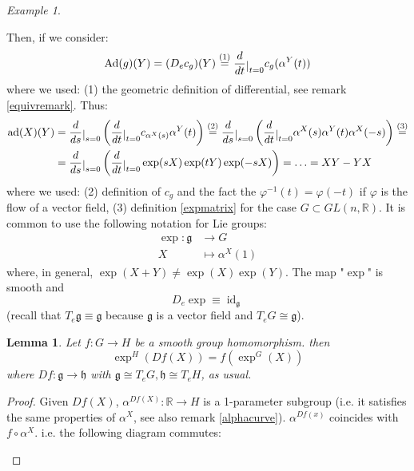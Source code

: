 \documentclass[a4paper,11pt,titlepage, article, oneside]{memoir}
\numberwithin{equation}{section}
\newtheorem{lemma}[theorem]{Lemma}
\theoremstyle{definition}
\theoremstyle{remark}
\newtheorem{example}[theorem]{Example}
\DeclareMathOperator{\id}{id}
\newcommand{\rfield}{\mathbb{R}}
\newcommand{\lie}[1]{\mathfrak{#1}}
\newcommand{\restrict}[2]{{#1}\raisebox{-.5ex}{$|$}_{#2}}
\newcommand{\diondi}[1]{\frac{d}{d{#1}}}
\begin{document}
\begin{tcolorbox}
\begin{example}
\begin{enumerate}
\end{enumerate}
Then, if we consider:
$$\text{Ad}(g)(Y) = (D_e c_g)(Y) \overset{(1)}{=}  \restrict{\diondi{t}}{t=0} c_g (\alpha^Y(t))$$
where we used: (1) the geometric definition of differential, see remark \ref{equivremark}.
Thus:
\begin{align*}
\text{ad}(X)(Y) &= \restrict{\diondi{s}}{s=0} \left(  \restrict{\diondi{t}}{t=0} c_{\alpha^X(s)} \alpha^Y (t) \right ) \overset{(2)}{=} \restrict{\diondi{s}}{s=0} \left(  \restrict{\diondi{t}}{t=0} \alpha^X(s) \alpha^Y(t) \alpha^X(-s) \right)  \overset{(3)}{=}  \\
&= \restrict{\diondi{s}}{s=0} \left(  \restrict{\diondi{t}}{t=0} \exp(sX) \exp(tY) \exp(-sX) \right) = \ldots = XY -YX
\end{align*}
where we used: (2) definition of $c_g$ and the fact the $\varphi^{-1}(t) = \varphi(-t)$ if $\varphi$ is the flow of a vector field, (3) definition \eqref{expmatrix} for the case $G \subset GL(n, \rfield)$.
It is common to use the following notation for Lie groups:
\begin{align}
\exp \colon \lie{g} &\rightarrow G \\
X &\mapsto \alpha^X(1) \nonumber
\end{align}
where, in general, $\exp(X+Y) \not = \exp(X)\exp(Y)$. The map "$\exp$" is smooth and 
\begin{equation} \label{deexp}
D_e \exp \equiv \id_{\lie{g}}
\end{equation}
(recall that $T_e \lie{g} \equiv \lie{g}$ because $\lie{g}$ is a vector field and $T_e G \cong \lie{g}$).
\end{example}
\end{tcolorbox}

\begin{lemma}
Let $f \colon G \rightarrow H$ be a smooth group homomorphism. then
\begin{equation}
\exp^H \left(Df(X) \right) = f \left( \exp^G(X) \right)
\end{equation}
where $Df \colon \lie{g} \rightarrow \lie{h}$ with $\lie{g} \cong T_e G, \lie{h} \cong T_e H$, as usual.
\end{lemma}
\begin{proof}
Given $Df(X)$, $\alpha^{Df(X)} \colon \rfield \rightarrow H$ is a 1-parameter subgroup (i.e. it satisfies the same properties of $\alpha^X$, see also remark \ref{alphacurve}). $\alpha^{Df(x)}$ coincides with $f \circ \alpha^X$. i.e. the following diagram commutes:
\begin{center}
\end{center}
\end{proof}
\end{document}
